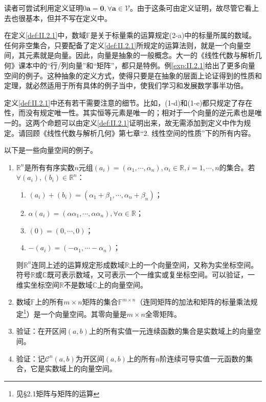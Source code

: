 \documentclass[../main.tex]{subfiles}
\begin{document}
读者可尝试利用定义证明$0\mathbf{a}=\mathbf{0},\forall\mathbf{a}\in\mathcal{V}$。由于这条可由定义证明，故尽管它看上去也很基本，但并不写在定义中。

在定义\ref{def:II.2.1}中，数域$\mathbb{F}$是关于标量乘的运算规定(2-a)中的标量所属的数域。任何非空集合，只要配备了定义\ref{def:II.2.1}所规定的运算法则，就是一个向量空间，其元素就是向量。因此，向量是抽象的一般概念。大一的《线性代数与解析几何》课本中的“行/列向量”和“矩阵”，都只是特例。例\ref{exp:II.2.1}给出了更多向量空间的例子。这种抽象的定义方式，使得只要是在抽象的层面上论证得到的性质和定理，就必然适用于所有具体的例子当中，使我们学习和发展数学事半功倍。

定义\ref{def:II.2.1}中还有若干需要注意的细节。比如，(1-d)和(1-e)都只规定了存在性，而没有规定唯一性。其实恒等元素是唯一的；相对于一个向量的逆元素也是唯一的。这两个命题可以由定义\ref{def:II.2.1}证明出来，故无需添加到定义中作为规定。请回顾《线性代数与解析几何》第七章“2. 线性空间的性质”下的所有内容。

\begin{example}\label{exp:II.2.1}
    以下是一些向量空间的例子。
    \begin{enumerate}
        \item $\mathbb{R}^n$是所有有序实数$n$元组$\left(a_i\right)=\left(\alpha_1,\cdots,\alpha_n\right),\alpha_i\in\mathbb{R},i=1,\cdots,n$的集合。若$\forall \left(a_i\right),\left(b_i\right)\in\mathbb{R}^n$：
              \begin{enumerate}
                  \item $\left(a_i\right)+\left(b_i\right)=\left(\alpha_1+\beta_1,\cdots,\alpha_n+\beta_n\right)$；
                  \item $\alpha\left(a_i\right)=\left(\alpha\alpha_1,\cdots,\alpha\alpha_n\right),\forall\alpha\in\mathbb{R}$；
                  \item $\left(0\right)=\left(0,\cdots,0\right)$；
                  \item $-\left(a_i\right)=\left(-\alpha_1,\cdots-\alpha_n\right)$；
              \end{enumerate}
              则$\mathbb{R}^n$连同上述的运算规定形成数域$\mathbb{R}$上的一个向量空间，又称为实坐标空间。符号$\mathbb{R}$或$\mathbb{C}$既可表示数域，又可表示一个一维实或复坐标空间。可以验证，一维实坐标空间$\mathbb{R}$不是数域$\mathbb{C}$上的向量空间。
        \item 数域$\mathbb{F}$上的所有$m\times n$矩阵的集合$\mathbb{F}^{m\times n}$（连同矩阵的加法和矩阵的标量乘法规定\footnote{见\cite{周胜林2012线性代数}\S 2.1矩阵与矩阵的运算}）是一个向量空间。其零向量是$m\times n$全零矩阵\cite[\S 7.1例1.3]{周胜林2012线性代数}。
        \item 验证：在开区间$\left(a,b\right)$上的所有实值一元连续函数的集合是实数域上的向量空间\cite[\S 7.1例1.1]{周胜林2012线性代数}。
        \item 验证：记$\mathcal{C}^n\left(a,b\right)$为开区间$\left(a,b\right)$上的所有$n$阶连续可导实值一元函数的集合，它是实数域上的向量空间。
    \end{enumerate}
\end{example}
\end{document}
